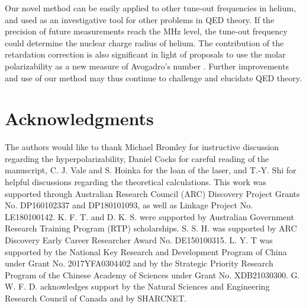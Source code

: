 \documentclass[12pt]{article}
\begin{document}
Our novel method can be easily applied to other tune-out frequencies in helium, and used as an investigative tool for other problems in QED theory. If the precision of future measurements reach the MHz level, the tune-out frequency could determine the nuclear charge radius of helium. The contribution of the retardation correction is also significant in light of proposals to use the molar polarizability as a new measure of Avogadro's number \cite{Silvestri2018HeliumBasedRF}. Further improvements and use of our method may thus continue to challenge and elucidate QED theory.
 
\section*{Acknowledgments}

The authors would like to thank Michael Bromley for instructive discussion regarding the hyperpolarizability, Daniel Cocks for careful reading of the manuscript, C. J. Vale and S. Hoinka for the loan of the laser, and T.-Y. Shi for helpful discussions regarding the theoretical calculations. This work was supported through Australian Research Council (ARC) Discovery Project Grants No. DP160102337 and DP180101093, as well as Linkage Project No. LE180100142. K. F. T. and D. K. S. were supported by Australian Government Research Training Program (RTP) scholarships. S. S. H. was supported by ARC Discovery Early Career Researcher Award No. DE150100315. L. Y. T was supported by the National Key Research and Development Program of China under Grant No. 2017YFA0304402 and by the Strategic Priority Research Program of the Chinese Academy of Sciences under Grant No. XDB21030300. G. W. F. D. acknowledges support by the Natural Sciences and Engineering Research Council of Canada and by SHARCNET.

% 
\nocite{PhysRevLett.125.013002,footnote1,grimm1999optical,Dall2007a,footnote2,Manning:10,PhysRevA.97.063601,footnote3,bryce_bootstrap_error_code,HAGEL19991,Wu:13,Fendel:07,wstechnical,HolmgrenPhd,PhysRevA.92.052501,BetheSalpeter,Piszczatowski2015,Puchalski2016,PhysRevA.101.022505,PhysRevA.99.040502,Yerokhin2010,Araki,Sucher,Piszczatowski2015,Pachucki2006,PhysRevA.101.022505,DrakeBL,PhysRevA.99.041803,Drake2019,PhysRevA.99.041803,Ho2020,Drake88,Drake92,Pachucki2006,PhysRevA.88.052515,PhysRevA.92.052501}

% 
 
\end{document}

